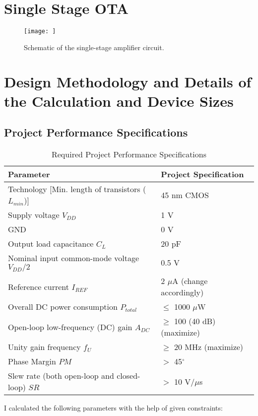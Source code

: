 \section{Single Stage OTA}
\begin{figure}[h]
    \centering
    \texttt{[image: ]}
    \caption{Schematic of the single-stage amplifier circuit.}
\end{figure}

\section{Design Methodology and Details of the Calculation and Device Sizes}

\subsection{Project Performance Specifications}
\captionsetup{justification=centerlast} %
\begin{center}
    \begin{table}[h]
    \centering
    \renewcommand{\arraystretch}{1.2}
    \caption{Required Project Performance Specifications}
    \begin{tabular}{l l}
        \toprule
        \textbf{Parameter} & \textbf{Project Specification} \\
        \midrule
        Technology [Min. length of transistors ($L_{min}$)] & 45 nm CMOS \\
        Supply voltage $V_{DD}$ & 1 V \\
        GND & 0 V \\
        Output load capacitance $C_L$ & 20 pF \\
        Nominal input common-mode voltage $V_{DD}/2$ & 0.5 V \\
        Reference current $I_{REF}$ & 2 $\mu$A (change accordingly) \\
        Overall DC power consumption $P_{total}$ & $\leq$ 1000 $\mu$W \\
        \midrule
        Open-loop low-frequency (DC) gain $A_{DC}$ & $\geq$ 100 (40 dB) (maximize) \\
        Unity gain frequency $f_U$ & $\geq$ 20 MHz (maximize) \\
        Phase Margin $PM$ & $>$ 45$^\circ$ \\
        Slew rate (both open-loop and closed-loop) $SR$ & $>$ 10 V/$\mu$s \\
        \bottomrule
    \end{tabular}
\end{table}
\end{center}
 I calculated the following parameters with the help of given constraints:
